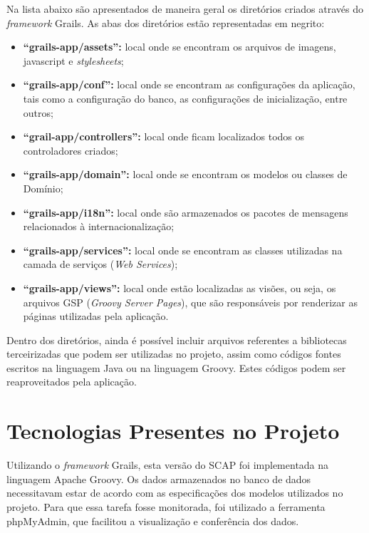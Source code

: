 Na lista abaixo são apresentados de maneira geral os diretórios criados através do \textit{framework} Grails. As abas dos diretórios estão representadas em negrito:

\begin{itemize}

	\item \textbf{``grails-app/assets'':} local onde se encontram os arquivos de imagens, javascript e \textit{stylesheets};

	\item \textbf{``grails-app/conf'':} local onde se encontram as configurações da aplicação, tais como a configuração do banco, as configurações de inicialização, entre outros;

	\item \textbf{``grail-app/controllers'':} local onde ficam localizados todos os controladores criados;
	
	\item \textbf{``grails-app/domain'':} local onde se encontram os modelos ou classes de Domínio;
	
	\item \textbf{``grails-app/i18n'':} local onde são armazenados os pacotes de mensagens relacionados à internacionalização;
	
	\item \textbf{``grails-app/services'':} local onde se encontram as classes utilizadas na camada de serviços (\textit{Web Services});
	
	\item \textbf{``grails-app/views'':} local onde estão localizadas as visões, ou seja, os arquivos GSP (\textit{Groovy Server Pages}), que são responsáveis por renderizar as páginas utilizadas pela aplicação. 
	
\end{itemize}

Dentro dos diretórios, ainda é possível incluir arquivos referentes a bibliotecas terceirizadas que podem ser utilizadas no projeto, assim como códigos fontes escritos na linguagem Java ou na linguagem Groovy. Estes códigos podem ser reaproveitados pela aplicação.

\section{Tecnologias Presentes no Projeto}
\label{sec-projeto-tecnologias-presentes}

Utilizando o \textit{framework} Grails, esta versão do SCAP foi implementada na linguagem Apache Groovy. Os dados armazenados no banco de dados necessitavam estar de acordo com as especificações dos modelos utilizados no projeto. Para que essa tarefa fosse monitorada, foi utilizado a ferramenta phpMyAdmin, que facilitou a visualização e conferência dos dados.

